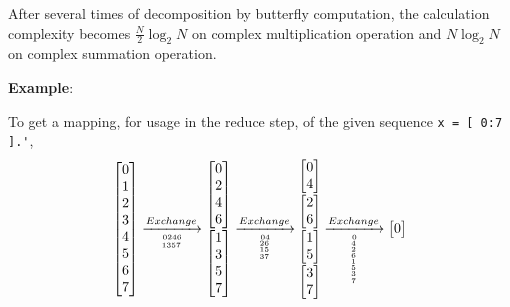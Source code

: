 After several times of decomposition by butterfly computation,
the calculation complexity becomes
$\frac{N}{2}\log_2 N$ on complex multiplication operation and
$N \log_2 N$ on complex summation operation.

{\bf Example}:

To get a mapping, for usage in the reduce step,
of the given sequence \verb|x = [ 0:7 ].'|,
\[
\begin{bmatrix} 0\\ 1\\ 2\\ 3\\ 4\\ 5\\ 6\\ 7 \end{bmatrix}
\xrightarrow[0246\atop 1357]{Exchange}
{\substack{
\begin{bmatrix} 0\\ 2\\ 4\\ 6 \end{bmatrix} \\
\begin{bmatrix} 1\\ 3\\ 5\\ 7 \end{bmatrix}
}}
\xrightarrow[04\atop{26\atop{15\atop 37}}]{Exchange}
{\substack{
\begin{bmatrix} 0\\ 4\\ \end{bmatrix} \\
\begin{bmatrix} 2\\ 6\\ \end{bmatrix} \\
\begin{bmatrix} 1\\ 5\\ \end{bmatrix} \\
\begin{bmatrix} 3\\ 7 \end{bmatrix}
}}
\xrightarrow[0\atop{4\atop{2\atop{6\atop{1\atop{5\atop{3\atop 7}}}}}}]{Exchange}
{\substack{
\begin{bmatrix} 0\\ \end{bmatrix} \\
}}\]
